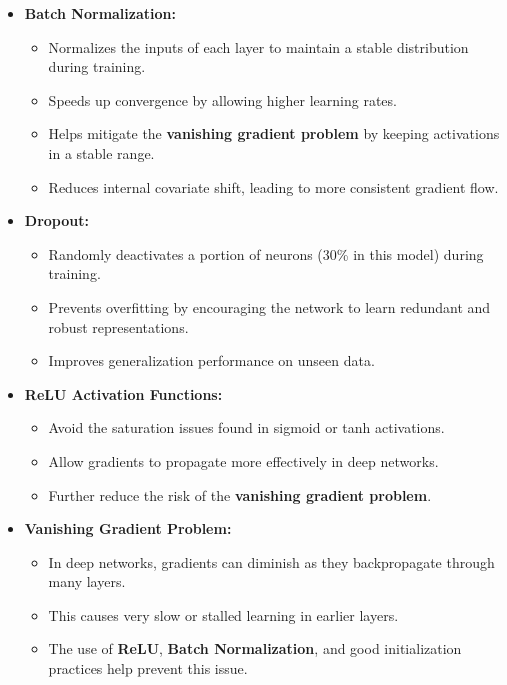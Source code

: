 \documentclass{article}
\begin{document}
\begin{itemize}
    \item \textbf{Batch Normalization:}
    \begin{itemize}
        \item Normalizes the inputs of each layer to maintain a stable distribution during training.
        \item Speeds up convergence by allowing higher learning rates.
        \item Helps mitigate the \textbf{vanishing gradient problem} by keeping activations in a stable range.
        \item Reduces internal covariate shift, leading to more consistent gradient flow.
    \end{itemize}

    \item \textbf{Dropout:}
    \begin{itemize}
        \item Randomly deactivates a portion of neurons (30\% in this model) during training.
        \item Prevents overfitting by encouraging the network to learn redundant and robust representations.
        \item Improves generalization performance on unseen data.
    \end{itemize}

    \item \textbf{ReLU Activation Functions:}
    \begin{itemize}
        \item Avoid the saturation issues found in sigmoid or tanh activations.
        \item Allow gradients to propagate more effectively in deep networks.
        \item Further reduce the risk of the \textbf{vanishing gradient problem}.
    \end{itemize}

    \item \textbf{Vanishing Gradient Problem:}
    \begin{itemize}
        \item In deep networks, gradients can diminish as they backpropagate through many layers.
        \item This causes very slow or stalled learning in earlier layers.
        \item The use of \textbf{ReLU}, \textbf{Batch Normalization}, and good initialization practices help prevent this issue.
    \end{itemize}
\end{itemize}
\end{document}
